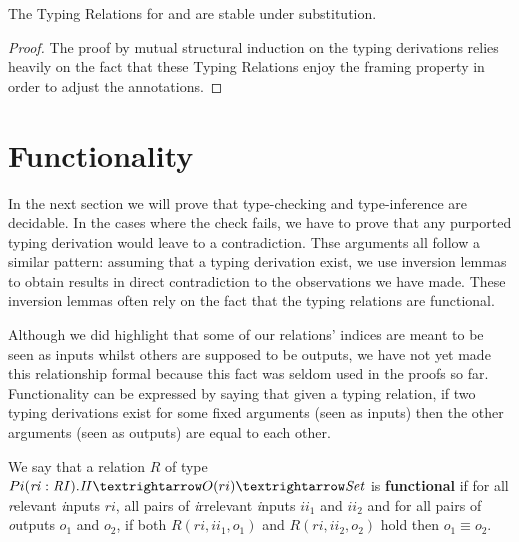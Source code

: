 \begin{theorem}\label{theorem:substituting}
The Typing Relations for \Inferable{} and \Checkable{} are stable under substitution.
\end{theorem}
\begin{proof}
The proof by mutual structural induction on the typing derivations relies
heavily on the fact that these Typing Relations enjoy the framing property
in order to adjust the \Usages{} annotations.
\end{proof}



\section{Functionality}\label{sec:functional}

In the next section we will prove that type-checking and type-inference are
decidable. In the cases where the check fails, we have to prove that any
purported typing derivation would leave to a contradiction. Thse arguments
all follow a similar pattern: assuming that a typing derivation exist, we
use inversion lemmas to obtain results in direct contradiction to the
observations we have made. These inversion lemmas often rely on the fact
that the typing relations are functional.

Although we did highlight that some of our relations' indices are meant
to be seen as inputs whilst others are supposed to be outputs, we have
not yet made this relationship formal because this fact was seldom used
in the proofs so far. Functionality can be expressed by saying that given
a typing relation, if two typing derivations exist for some fixed arguments
(seen as inputs) then the other arguments (seen as outputs) are equal to each
other.

\begin{definition}We say that a relation $R$ of type
$\ensuremath{Pi}(\mathit{ri} : \mathit{RI}). \mathit{II} → O(ri) → \Set{}$
is \textbf{functional} if for all \emph{r}elevant \emph{i}nputs $\mathit{ri}$, all pairs of
\emph{i}rrelevant \emph{i}nputs $\mathit{ii\ensuremath{_1}}$ and $\mathit{ii\ensuremath{_2}}$ and for all pairs
of \emph{o}utputs $o\ensuremath{_1}$ and $o\ensuremath{_2}$, if both $R(\mathit{ri}, \mathit{ii\ensuremath{_1}}, o\ensuremath{_1})$
and $R(\mathit{ri}, \mathit{ii\ensuremath{_2}}, o\ensuremath{_2})$ hold then $o\ensuremath{_1} \ensuremath{\equiv} o\ensuremath{_2}$.
\end{definition}

